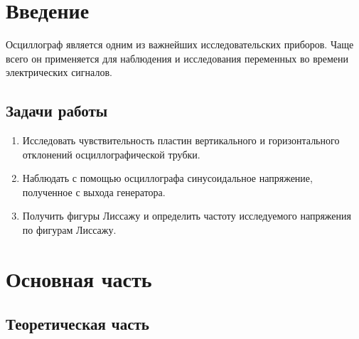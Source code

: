 

\section{Введение}
Осциллограф является одним из важнейших исследовательских приборов. Чаще всего
он применяется для наблюдения и исследования переменных во времени электрических
сигналов.


\subsection{Задачи работы}


\begin{enumerate}
    \item Исследовать чувствительность пластин вертикального и горизонтального
отклонений осциллографической трубки.
    \item Наблюдать с помощью осциллографа синусоидальное напряжение, полученное с
выхода генератора.
        \item Получить фигуры Лиссажу и определить частоту исследуемого напряжения по
фигурам Лиссажу.

\end{enumerate}




\section{Основная часть}

\subsection{Теоретическая часть}
